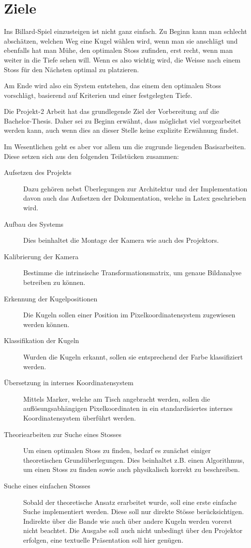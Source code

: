 \chapter{Ziele}
Ins Billard-Spiel einzusteigen ist nicht ganz einfach. Zu Beginn kann man schlecht abschätzen, welchen Weg eine Kugel
wählen wird, wenn man sie anschlägt und ebenfalls hat man Mühe, den optimalen Stoss zufinden, erst recht, wenn
man weiter in die Tiefe sehen will. Wenn es also wichtig wird, die Weisse nach einem Stoss für den Nächsten optimal
zu platzieren.

Am Ende wird also ein System entstehen, das einem den optimalen Stoss vorschlägt, basierend auf Kriterien und
einer festgelegten Tiefe.

Die Projekt-2 Arbeit hat das grundlegende Ziel der Vorbereitung auf die Bachelor-Thesis. Daher sei zu Beginn erwähnt,
dass möglichst viel vorgearbeitet werden kann, auch wenn dies an dieser Stelle keine explizite Erwähnung findet.

Im Wesentlichen geht es aber vor allem um die zugrunde liegenden Basisarbeiten. Diese setzen sich aus den folgenden
Teilstücken zusammen:
\begin{description}
    \item[Aufsetzen des Projekts] Dazu gehören nebst Überlegungen zur Architektur und der Implementation davon auch
    das Aufsetzen der Dokumentation, welche in Latex geschrieben wird.
    \item[Aufbau des Systems] Dies beinhaltet die Montage der Kamera wie auch des Projektors.
    \item[Kalibrierung der Kamera] Bestimme die intrinsische Transformationsmatrix, um genaue Bildanalyse betreiben zu
    können.
    \item[Erkennung der Kugelpositionen] Die Kugeln sollen einer Position im Pixelkoordinatensystem zugewiesen werden
    können.
    \item[Klassifikation der Kugeln] Wurden die Kugeln erkannt, sollen sie entsprechend der Farbe klassifiziert werden.
    \item[Übersetzung in internes Koordinatensystem] Mittels Marker, welche am Tisch angebracht werden, sollen die
    auflösungsabhängigen Pixelkoordinaten in ein standardisiertes internes Koordinatensystem überführt werden.
    \item[Theoriearbeiten zur Suche eines Stosses] Um einen optimalen Stoss zu finden, bedarf es zunächst einiger
    theoretischen Grundüberlegungen. Dies beinhaltet z.B. einen Algorithmus, um einen Stoss zu finden sowie auch
    physikalisch korrekt zu beschreiben.
    \item[Suche eines einfachen Stosses] Sobald der theoretische Ansatz erarbeitet wurde, soll eine erste einfache
    Suche implementiert werden. Diese soll nur direkte Stösse berücksichtigen. Indirekte über die Bande wie auch über
    andere Kugeln werden vorerst nicht beachtet. Die Ausgabe soll auch nicht unbedingt über den Projektor erfolgen, eine
    textuelle Präsentation soll hier genügen.
\end{description}

